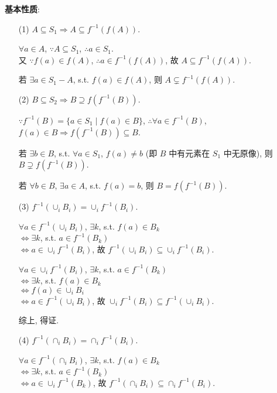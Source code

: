\documentclass{note}
\begin{document}
\textbf{基本性质}:
\begin{itemize}
    \item[(1)] $A\subseteq S_1\Longrightarrow A\subseteq f^{-1}(f(A))$.
    \begin{pf}
        $\forall a\in A$, $\because A\subseteq S_1$, $\therefore a\in S_1$.\\
        又 $\because f(a)\in f(A)$, $\therefore a\in f^{-1}(f(A))$, 故 $A\subseteq f^{-1}(f(A))$.
    \end{pf}

    若 $\exists a\in S_1-A$, s.t. $f(a)\in f(A)$, 则 $A\subsetneq f^{-1}(f(A))$.
    \item[(2)] $B\subseteq S_2\Longrightarrow B\supseteq f(f^{-1}(B))$.
    \begin{pf}
        $\because f^{-1}(B)=\{a\in S_1\mid f(a)\in B\}$, $\therefore\forall a\in f^{-1}(B)$, $f(a)\in B\Longrightarrow f(f^{-1}(B))\subseteq B$.
    \end{pf}

    若 $\exists b\in B$, s.t. $\forall a\in S_1$, $f(a)\neq b$ (即 $B$ 中有元素在 $S_1$ 中无原像), 则 $B\supsetneq f(f^{-1}(B))$.

    若 $\forall b\in B$, $\exists a\in A$, s.t. $f(a)=b$, 则 $B=f(f^{-1}(B))$.
    \item[(3)] $f^{-1}(\cup_iB_i)=\cup_if^{-1}(B_i)$.
    \begin{pf}
        $\forall a\in f^{-1}(\cup_iB_i)$, $\exists k$, s.t. $f(a)\in B_k$\\
        $\Longleftrightarrow\exists k$, s.t. $a\in f^{-1}(B_k)$\\
        $\Longleftrightarrow a\in\cup_if^{-1}(B_i)$, 故 $f^{-1}(\cup_iB_i)\subseteq\cup_if^{-1}(B_i)$.

        $\forall a\in\cup_if^{-1}(B_i)$, $\exists k$, s.t. $a\in f^{-1}(B_k)$\\
        $\Longleftrightarrow\exists k$, s.t. $f(a)\in B_k$\\
        $\Longleftrightarrow f(a)\in\cup_iB_i$\\
        $\Longleftrightarrow a\in f^{-1}(\cup_iB_i)$, 故 $\cup_if^{-1}(B_i)\subseteq f^{-1}(\cup_iB_i)$.

        综上, 得证.
    \end{pf}
    \item[(4)] $f^{-1}(\cap_iB_i)=\cap_if^{-1}(B_i)$.
    \begin{pf}
        $\forall a\in f^{-1}(\cap_iB_i)$, $\exists k$, s.t. $f(a)\in B_k$\\
        $\Longleftrightarrow\exists k$, s.t. $a\in f^{-1}(B_k)$\\
        $\Longleftrightarrow a\in\cup_if^{-1}(B_k)$, 故 $f^{-1}(\cap_iB_i)\subseteq\cap_if^{-1}(B_i)$.


\end{pf}
\end{itemize}
\end{document}
